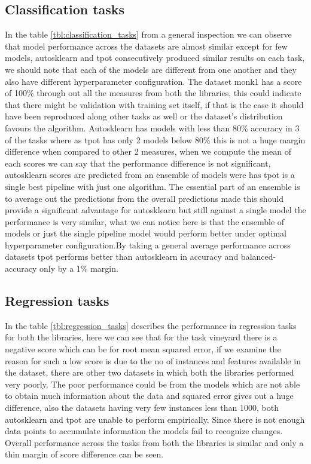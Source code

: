 \subsection{Classification tasks}
\label{classficationtasks}
In the table \ref{tbl:classification_tasks} from a general inspection we can  observe that model performance across the datasets are almost similar except for few models, autosklearn and tpot consecutively produced similar results on each task, we should note that each of the models are different from one another and they also have different hyperparameter configuration. The dataset monk1 has a score of 100\% through out all the measures from both the libraries, this could indicate that there might be validation with training set itself, if that is the case it should have been reproduced along other tasks as well or the dataset's distribution favours the algorithm. Autosklearn has models with less than 80\% accuracy in 3 of the tasks where as  tpot has only 2 models below 80\% this is not a huge margin difference when compared to other 2 measures, when we compute the mean of each scores we can say that the performance difference is not significant, autosklearn scores are predicted from an ensemble of models were has tpot is a single best pipeline with just one algorithm. The essential part of an ensemble is to average out the predictions from the overall predictions made this should provide a significant advantage for autosklearn but still against a single model the performance is very similar, what we can notice here is that the ensemble of models or just the single pipeline model would perform better under optimal hyperparameter configuration.By taking a general average performance across datasets tpot performs better than autosklearn in accuracy and balanced-accuracy only by a 1\% margin.

\subsection{Regression tasks}
In the table \ref{tbl:regression_tasks} describes the performance in regression tasks for both the libraries, here we can see that for the task vineyard there is a negative score which can be for root mean squared error, if we examine the reason for such a low score is due to the no of instances and features available in the dataset, there are other two datasets in which both the libraries performed very poorly. The poor performance could be from the models which are not able to obtain much information about the data and squared error gives out a huge difference, also the datasets having very few instances less than 1000, both autosklearn and tpot are unable to perform empirically. Since there is not enough data points to accumulate information the models fail to recognize changes. Overall performance across the tasks
from both the libraries is similar and only a thin margin of score difference can be seen.

